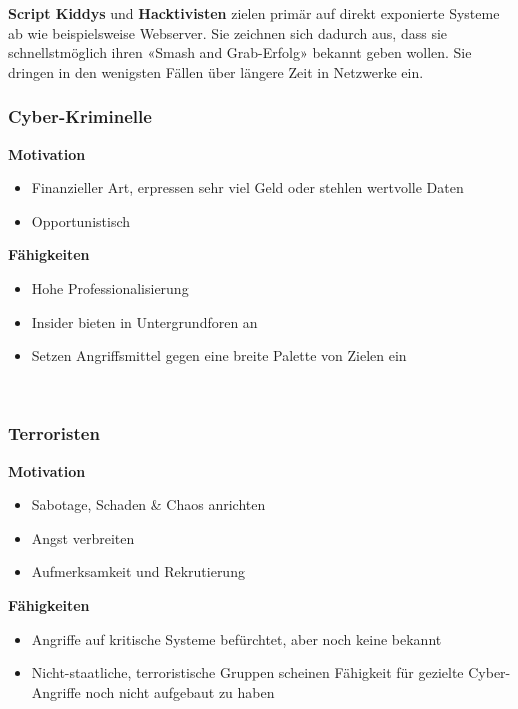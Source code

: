 \textbf{Script Kiddys} und \textbf{Hacktivisten} zielen primär auf direkt exponierte Systeme ab wie beispielsweise Webserver. Sie zeichnen sich dadurch aus, dass sie schnellstmöglich ihren «Smash and Grab-Erfolg» bekannt geben wollen. Sie dringen in den wenigsten Fällen über längere Zeit in Netzwerke ein.


\subsubsection{Cyber-Kriminelle}
\vspace{-8pt}
\begin{multicols*}{2}
    \textbf{Motivation}
    \begin{itemize}
        \item Finanzieller Art, erpressen sehr viel Geld oder stehlen wertvolle Daten
        \item Opportunistisch
    \end{itemize}
    \columnbreak
    \textbf{Fähigkeiten}
    \begin{itemize}
        \item Hohe Professionalisierung
        \item Insider bieten in Untergrundforen an
        \item Setzen Angriffsmittel gegen eine breite Palette von Zielen ein
    \end{itemize}
\end{multicols*}


\vfill
$ $
\columnbreak


\subsubsection{Terroristen}
\vspace{-8pt}
\begin{multicols*}{2}
    \textbf{Motivation}
    \begin{itemize}
        \item Sabotage, Schaden \& Chaos anrichten
        \item Angst verbreiten
        \item Aufmerksamkeit und Rekrutierung
    \end{itemize}
    \vfill
    \columnbreak
    \textbf{Fähigkeiten}
    \begin{itemize}
        \item Angriffe auf kritische Systeme befürchtet, aber noch keine bekannt
        \item Nicht-staatliche, terroristische Gruppen scheinen Fähigkeit für gezielte Cyber-Angriffe noch nicht aufgebaut zu haben
    \end{itemize}
\end{multicols*}
\vspace{-8pt}


